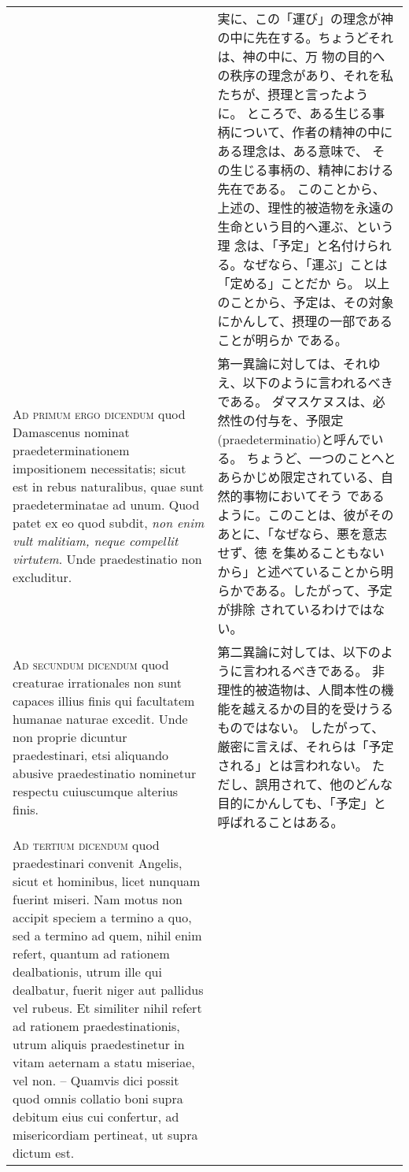 \documentclass[10pt]{jsarticle} %
\begin{document}
\begin{longtable}{p{21em}p{21em}}
 
&

実に、この「運び」の理念が神の中に先在する。ちょうどそれは、神の中に、万
 物の目的への秩序の理念があり、それを私たちが、摂理と言ったよう
 に。
ところで、ある生じる事柄について、作者の精神の中にある理念は、ある意味で、
 その生じる事柄の、精神における先在である。
このことから、上述の、理性的被造物を永遠の生命という目的へ運ぶ、という理
 念は、「予定」と名付けられる。なぜなら、「運ぶ」ことは「定める」ことだか
 ら。
以上のことから、予定は、その対象にかんして、摂理の一部であることが明らか
 である。


\\


{\scshape Ad primum ergo dicendum} quod Damascenus
nominat praedeterminationem impositionem necessitatis; sicut est in
rebus naturalibus, quae sunt praedeterminatae ad unum. Quod patet ex eo
quod subdit, {\itshape non enim vult malitiam, neque compellit virtutem}. Unde
praedestinatio non excluditur.


 
&


第一異論に対しては、それゆえ、以下のように言われるべきである。
ダマスケヌスは、必然性の付与を、予限定(praedeterminatio)と呼んでいる。
ちょうど、一つのことへとあらかじめ限定されている、自然的事物においてそう
 であるように。このことは、彼がそのあとに、「なぜなら、悪を意志せず、徳
 を集めることもないから」と述べていることから明らかである。したがって、予定が排除
 されているわけではない。

\\


{\scshape Ad secundum dicendum} quod creaturae
irrationales non sunt capaces illius finis qui facultatem humanae
naturae excedit. Unde non proprie dicuntur praedestinari, etsi aliquando
abusive praedestinatio nominetur respectu cuiuscumque alterius finis.


 
&

第二異論に対しては、以下のように言われるべきである。
非理性的被造物は、人間本性の機能を越えるかの目的を受けうるものではない。
 したがって、厳密に言えば、それらは「予定される」とは言われない。
ただし、誤用されて、他のどんな目的にかんしても、「予定」と呼ばれることはある。


\\


{\scshape Ad tertium dicendum} quod praedestinari
convenit Angelis, sicut et hominibus, licet nunquam fuerint miseri. Nam
motus non accipit speciem a termino a quo, sed a termino ad quem, nihil
enim refert, quantum ad rationem dealbationis, utrum ille qui dealbatur,
fuerit niger aut pallidus vel rubeus. Et similiter nihil refert ad
rationem praedestinationis, utrum aliquis praedestinetur in vitam
aeternam a statu miseriae, vel non. -- Quamvis dici possit quod omnis
collatio boni supra debitum eius cui confertur, ad misericordiam
pertineat, ut supra dictum est.


\end{longtable}
\end{document}
